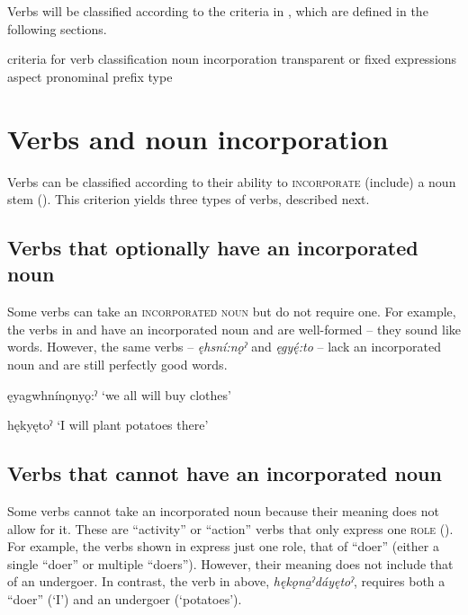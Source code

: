 Verbs will be classified according to the criteria in , which are defined in the following sections.

\ea\label{ex:verbcriteria} criteria for verb classification
\ea noun incorporation 
\ex transparent or fixed expressions
\ex aspect
\ex pronominal prefix type
\z
\z


\section{Verbs and noun incorporation} \label{Verbs and noun incorporation}
Verbs can be classified according to their ability to \textsc{incorporate} (include) a noun stem (). This criterion yields three types of verbs, described next.


\subsection{Verbs that optionally have an incorporated noun} \label{Verbs that optionally have an incorporated noun}
Some verbs can take an \textsc{incorporated noun} but do not require one. For example, the verbs in  and  have an incorporated noun and are well-formed -- they sound like words. However, the same verbs -- \textit{ęhsní:nǫˀ} and \textit{ęgyę́:to} -- lack an incorporated noun and are still perfectly good words. 

\ea\label{ex:verbex21}
ęyagwhnínǫnyǫ:ˀ ‘we all will buy clothes’
\z


\ea\label{ex:verbex22}
hękyętoˀ ‘I will plant potatoes there’
\z


\subsection{Verbs that cannot have an incorporated noun} \label{Verbs that cannot have an incorporated noun}
Some verbs cannot take an incorporated noun because their meaning does not allow for it. These are “activity” or “action” verbs that only express one \textsc{role} (). For example, the verbs shown in  express just one role, that of “doer” (either a single “doer” or multiple “doers”). However, their meaning does not include that of an undergoer. In contrast, the verb in  above, \textit{hękǫna̱ˀdáyętoˀ}, requires both a “doer” (‘I’) and an undergoer (‘potatoes’).

